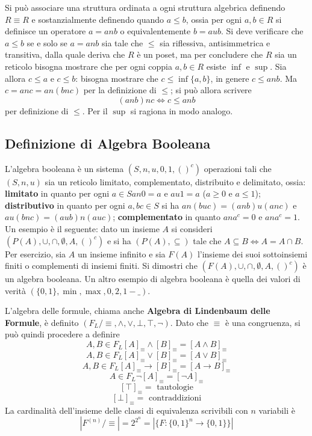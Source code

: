 Si può associare una struttura ordinata 
a ogni struttura algebrica definendo $R \equiv R$ e 
sostanzialmente definendo quando $a \leq b$, ossia 
per ogni $a, b \in R$ si definisce un operatore 
$ a = a n b $ o equivalentemente $b = a u b$. Si deve verificare 
che $a \leq b$ se e solo se $a = a n b$ sia tale 
che $\leq$ sia riflessiva, antisimmetrica e transitiva, 
dalla quale deriva che $R$ è un poset, ma per 
concludere che $R$ sia un reticolo bisogna mostrare 
che per ogni coppia $a,b \in R$ esiste $\inf$ e $\sup$. 
Sia allora $c \leq a$ e $ c \leq b$: bisogna mostrare 
che $c \leq \inf\{a,b\}$, in genere 
$c \leq a n b$. 
Ma $c = a n c = a n (b n c)$ per la definizione di 
$\leq$; si può allora scrivere 
$$
(a n b) n c \iff c \leq a n b 
$$
per definizione di $\leq$. Per il $\sup$ si ragiona 
in modo analogo. 


\subsection{Definizione di Algebra Booleana}
L'algebra booleana è un sistema $(S, n, u, 0, 1, ()^c)$ operazioni 
tali che $(S,n,u)$ sia un reticolo limitato, complementato, 
distribuito e delimitato, ossia: 
\textbf{limitato} in quanto per ogni $a \in S a n 0 = a$ e $a u 1 = a$ ($ a \geq 0$ e $ a \leq 1$); 
\textbf{distributivo} in quanto per ogni $a,b c \in S$ si 
ha $a n (b u c) = (a n b) u (a n c)$ e $a u (b n c) = (a u b) n ( a u c)$; 
\textbf{complementato} in quanto 
$a n a^c = 0$ e $a n a^c = 1$. 
Un esempio è il seguente: dato un insieme $A$ si consideri 
$(P(A), \cup, \cap, \emptyset, A, ()^c)$ e si ha 
$(P(A), \subseteq)$ tale che $A \subseteq B \iff A = A \cap B$. 
Per esercizio, sia $A$ un insieme infinito e sia $F(A)$
l'insieme dei suoi sottoinsiemi finiti o complementi di insiemi 
finiti. Si dimostri che $(F(A), \cup, \cap, \emptyset, A, ()^c)$ è un algebra booleana. Un altro esempio di algebra 
booleana è quella dei valori di verità $(\{0,1\}, \min, \max, 0, 2, 1-\_)$. 

L'algebra delle formule, chiama anche \textbf{Algebra di 
Lindenbaum delle Formule}, è definito $(F_L/\equiv, \land, \lor, \bot, \top, \neg)$. 
Dato che $\equiv$ è una congruenza, si può quindi procedere a definire
$$
A,B \in F_L [A]_{\equiv} \land [B]_{\equiv} = [A \land B]_{\equiv}
$$
$$
A,B \in F_L [A]_{\equiv} \lor [B]_{\equiv} = [A \lor B]_{\equiv}
$$
$$
A,B \in F_L [A]_{\equiv} \rightarrow [B]_{\equiv} = [A \rightarrow B]_{\equiv}
$$
$$
A \in F_L \neg [A]_{\equiv} = [\neg A]_{\equiv}
$$
$$
[\top]_{\equiv} = \text{ tautologie}
$$
$$
[\bot]_{\equiv} = \text{ contraddizioni}
$$
La cardinalità dell'insieme delle classi di equivalenza scrivibili con $n$
variabili è 
$$
|F^{(n)}/\equiv| = 2 ^ {2^n} = |\{F: \{0,1\}^n \rightarrow \{0,1\}\}|
$$


